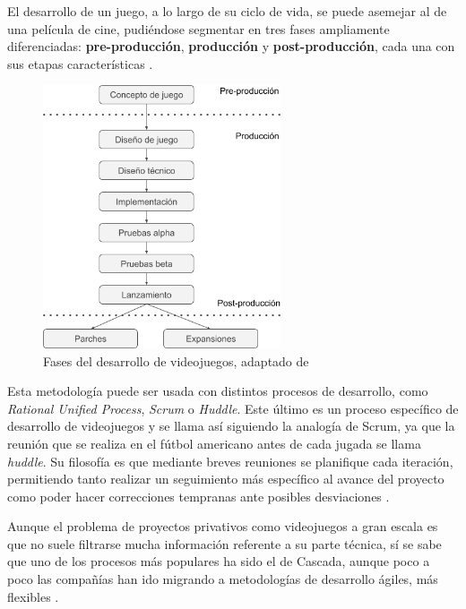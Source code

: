 El desarrollo de un juego, a lo largo de su ciclo de vida, se puede asemejar al de una película de cine, pudiéndose segmentar en tres fases ampliamente diferenciadas: \textbf{pre-producción}, \textbf{producción} y \textbf{post-producción}, cada una con sus etapas características \cite{bet-03}.

\vspace{0.4cm}

\begin{figure}[!h]
    \begin{center}
        \includegraphics[width=0.625\textwidth]{imagenes/5/pre-prod-post.png}
        \caption{Fases del desarrollo de videojuegos, adaptado de \cite{man-14}}
        \label{fig:fases-desarrollo}
    \end{center}
\end{figure}

Esta metodología puede ser usada con distintos procesos de desarrollo, como \textit{Rational Unified Process}, \textit{Scrum} o \textit{Huddle}. Este último es un proceso específico de desarrollo de videojuegos y se llama así siguiendo la analogía de Scrum, ya que la reunión que se realiza en el fútbol americano antes de cada jugada se llama \textit{huddle}. Su filosofía es que mediante breves reuniones se planifique cada iteración, permitiendo tanto realizar un seguimiento más específico al avance del proyecto como poder hacer correcciones tempranas ante posibles desviaciones \cite{mor-10}.

Aunque el problema de proyectos privativos como videojuegos a gran escala es que no suele filtrarse mucha información referente a su parte técnica, sí se sabe que uno de los procesos más populares ha sido el de Cascada, aunque poco a poco las compañías han ido migrando a metodologías de desarrollo ágiles, más flexibles \cite{mor-10}.


